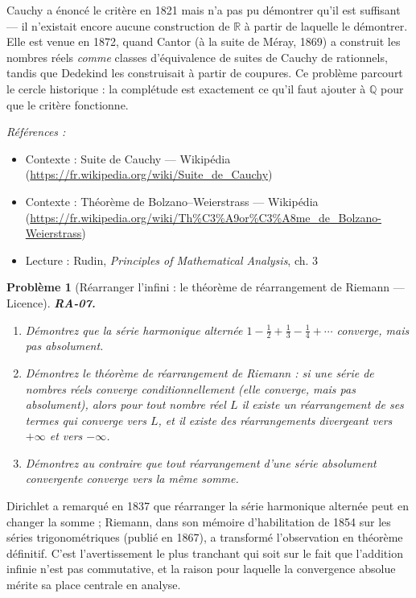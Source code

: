 \documentclass[11pt]{article}
\newtheorem{problem}{Problème}
\newenvironment{refs}{\par\small\noindent\emph{Références :}\begin{itemize}\setlength\itemsep{0pt}}{\end{itemize}\normalsize}
\begin{document}
\noindent Cauchy a énoncé le critère en 1821 mais n'a pas pu démontrer qu'il est suffisant ---
il n'existait encore aucune construction de $\mathbb{R}$ à partir de laquelle le démontrer. Elle est venue en
1872, quand Cantor (à la suite de Méray, 1869) a construit les nombres réels \textit{comme} classes
d'équivalence de suites de Cauchy de rationnels, tandis que Dedekind les construisait à partir de
coupures. Ce problème parcourt le cercle historique : la complétude est exactement ce qu'il faut
ajouter à $\mathbb{Q}$ pour que le critère fonctionne.

\begin{refs}
\item Contexte : Suite de Cauchy --- Wikipédia (\url{https://fr.wikipedia.org/wiki/Suite_de_Cauchy})
\item Contexte : Théorème de Bolzano--Weierstrass --- Wikipédia (\url{https://fr.wikipedia.org/wiki/Th%C3%A9or%C3%A8me_de_Bolzano-Weierstrass})
\item Lecture : Rudin, \textit{Principles of Mathematical Analysis}, ch. 3
\end{refs}

\bigskip

\begin{problem}[{Réarranger l'infini : le théorème de réarrangement de Riemann --- Licence}]
\textbf{RA-07.} \begin{enumerate}
\item[(a)] Démontrez que la série harmonique alternée
$ 1 - \frac{1}{2} + \frac{1}{3} - \frac{1}{4} + \cdots $ converge, mais pas absolument.
\item[(b)] Démontrez le théorème de réarrangement de Riemann : si une série de nombres réels converge
conditionnellement (elle converge, mais pas absolument), alors pour tout nombre réel $ L $ il
existe un réarrangement de ses termes qui converge vers $ L $, et il existe des réarrangements
divergeant vers $ +\infty $ et vers $ -\infty $.
\item[(c)] Démontrez au contraire que tout réarrangement d'une série absolument convergente converge vers
la même somme.
\end{enumerate}

\end{problem}

\noindent Dirichlet a remarqué en 1837 que réarranger la série harmonique alternée peut en
changer la somme ; Riemann, dans son mémoire d'habilitation de 1854 sur les séries trigonométriques
(publié en 1867), a transformé l'observation en théorème définitif. C'est l'avertissement le plus
tranchant qui soit sur le fait que l'addition infinie n'est pas commutative, et la raison pour
laquelle la \og{} convergence absolue \fg{} mérite sa place centrale en analyse.
\end{document}
